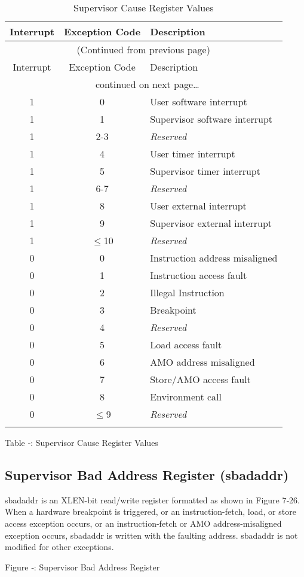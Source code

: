 \begin{longtable}[]{@{}ccl@{}}
\toprule
Interrupt & Exception Code & Description\tabularnewline
\midrule
\endfirsthead
\multicolumn{3}{c}{{(Continued from previous page)}} \\

\toprule
Interrupt & Exception Code & Description\tabularnewline
\midrule
\endhead

\midrule \multicolumn{3}{c}{{\tablename\ \thetable{} continued on next page\ldots}} \\
\endfoot

\endlastfoot

1 & 0 & User software interrupt\tabularnewline
1 & 1 & Supervisor software interrupt\tabularnewline
1 & 2-3 & \emph{Reserved}\tabularnewline
1 & 4 & User timer interrupt\tabularnewline
1 & 5 & Supervisor timer interrupt\tabularnewline
1 & 6-7 & \emph{Reserved}\tabularnewline
1 & 8 & User external interrupt\tabularnewline
1 & 9 & Supervisor external interrupt\tabularnewline
1 & $\leqslant$10 & \emph{Reserved}\tabularnewline
\midrule
0 & 0 & Instruction address misaligned\tabularnewline
0 & 1 & Instruction access fault\tabularnewline
0 & 2 & Illegal Instruction\tabularnewline
0 & 3 & Breakpoint\tabularnewline
0 & 4 & \emph{Reserved}\tabularnewline
0 & 5 & Load access fault\tabularnewline
0 & 6 & AMO address misaligned\tabularnewline
0 & 7 & Store/AMO access fault\tabularnewline
0 & 8 & Environment call\tabularnewline
0 & $\leqslant$9 & \emph{Reserved}\tabularnewline
\bottomrule
\caption{Supervisor Cause Register Values}
\label{tab:scause-reg-values}
\end{longtable}

\protect\hypertarget{_Ref326948300}{}{}Table ‑: Supervisor Cause
Register Values

\subsection{Supervisor Bad Address Register
(sbadaddr)}\label{supervisor-bad-address-register-sbadaddr}

sbadaddr is an XLEN-bit read/write register formatted as shown in Figure
7‑26. When a hardware breakpoint is triggered, or an instruction-fetch,
load, or store access exception occurs, or an instruction-fetch or AMO
address-misaligned exception occurs, sbadaddr is written with the
faulting address. sbadaddr is not modified for other exceptions.

\missingfigure{}

\protect\hypertarget{_Ref367099017}{}{}Figure ‑: Supervisor Bad Address
Register

